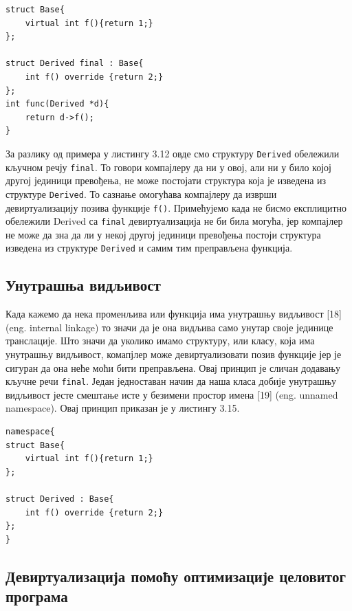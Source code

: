 \documentclass[12pt,oneside]{memoir}
\begin{document}
\begin{lstlisting}[frame=single,caption={Ključna reč final }, captionpos=b]
struct Base{
    virtual int f(){return 1;}
};

struct Derived final : Base{
    int f() override {return 2;}
};
int func(Derived *d){
    return d->f();
}

\end{lstlisting}
 
 За разлику од примера у листингу 3.12 овде смо структуру \texttt{Derived} обележили кључном 
 речју \texttt{final}.
 То говори компајлеру да ни у овој, али ни у било којој другој јединици превођења, 
 не може постојати структура која је изведена из структуре \texttt{Derived}.
 То сазнање омогућава компајлеру да изврши девиртуализацију позива функције \texttt{f()}.
 Примећујемо када не бисмо експлицитно обележили  Derived са \texttt{final} девиртуализација
 не би била могућа, јер компајлер не може да зна да ли у некој другој јединици превођења
 постоји структура изведена из структуре \texttt{Derived} и самим тим преправљена функција.
 
 \subsection{Унутрашња видљивост}
 Када кажемо да нека променљива или функција има унутрашњу видљивост [18]
 (eng. internal linkage) то значи да је она видљива само унутар своје јединице
 транслације.
 Што значи да уколико имамо структуру, или класу, која има унутрашњу видљивост,
 комапјлер може девиртуализовати позив функције јер је сигуран да она неће моћи бити
 преправљена.
 Овај принцип је сличан додавању кључне речи  \texttt{final}.
 Један једноставан начин да наша класа добије унутрашњу видљивост јесте смештање исте
 у безимени простор имена [19] (eng. unnamed namespace).
 Овај принцип приказан је у листингу 3.15.
 
 \begin{lstlisting}[frame=single,caption={Unutrašnja vidljivost}, captionpos=b]
namespace{
struct Base{
    virtual int f(){return 1;}
};

struct Derived : Base{
    int f() override {return 2;}
};
}
\end{lstlisting}
 
\subsection{Девиртуализација помоћу оптимизације целовитог програма}
 
\end{document}
